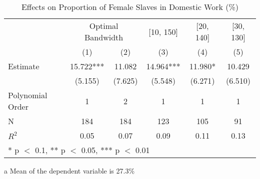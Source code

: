 \begin{table}[!h]

\caption{Effects on Proportion of Female Slaves in Domestic Work (\%) \label{tab:rdd_enslaved_domestic_women}}
\centering
\begin{threeparttable}
\begin{tabular}[t]{lccccc}
\toprule
\multicolumn{1}{c}{} & \multicolumn{2}{c}{Optimal Bandwidth} & \multicolumn{1}{c}{[10, 150]} & \multicolumn{1}{c}{[20, 140]} & \multicolumn{1}{c}{[30, 130]} \\
\cmidrule(l{3pt}r{3pt}){2-3} \cmidrule(l{3pt}r{3pt}){4-4} \cmidrule(l{3pt}r{3pt}){5-5} \cmidrule(l{3pt}r{3pt}){6-6}
  & (1) & (2) & (3) & (4) & (5)\\
\midrule
Estimate & \num{15.722}*** & \num{11.082} & \num{14.964}*** & \num{11.980}* & \num{10.429}\\
 & (\num{5.155}) & (\num{7.625}) & (\num{5.548}) & (\num{6.271}) & (\num{6.510})\\

\midrule
Polynomial Order & 1 & 2 & 1 & 1 & 1\\
N & \num{184} & \num{184} & \num{123} & \num{105} & \num{91}\\
$R^2$ & \num{0.05} & \num{0.07} & \num{0.09} & \num{0.11} & \num{0.13}\\
\bottomrule
\multicolumn{6}{l}{\rule{0pt}{1em}* p $<$ 0.1, ** p $<$ 0.05, *** p $<$ 0.01}\\
\end{tabular}
\begin{tablenotes}
\item[a] Mean of the dependent variable is 27.3\%
\end{tablenotes}
\end{threeparttable}
\end{table}

